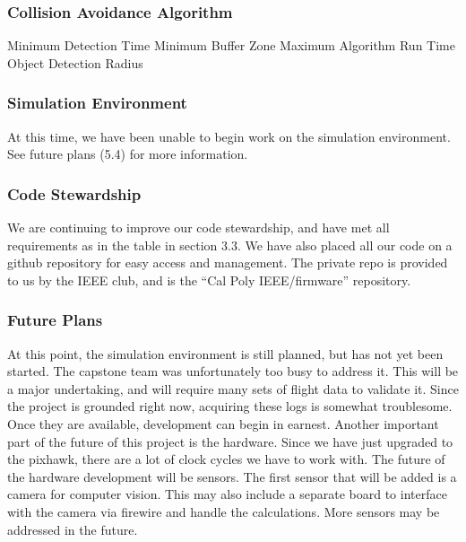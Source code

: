\documentclass[12pt]{article}
\begin{document}
\subsubsection{Collision Avoidance Algorithm}
Minimum Detection Time
Minimum Buffer Zone
Maximum Algorithm Run Time
Object Detection Radius

\subsubsection{Simulation Environment}
At this time, we have been unable to begin work on the simulation environment. See future plans (5.4) for more information.

\subsubsection{Code Stewardship}
We are continuing to improve our code stewardship, and have met all requirements as in the table in section 3.3. We have also placed all our code on a github repository for easy access and management. The private repo is provided to us by the IEEE club, and is the “Cal Poly IEEE/firmware” repository.

\subsubsection{Future Plans}
	At this point, the simulation environment is still planned, but has not yet been started. The capstone team was unfortunately too busy to address it. This will be a major undertaking, and will require many sets of flight data to validate it. Since the project is grounded right now, acquiring these logs is somewhat troublesome. Once they are available, development can begin in earnest.
	Another important part of the future of this project is the hardware. Since we have just upgraded to the pixhawk, there are a lot of clock cycles we have to work with. The future of the hardware development will be sensors. The first sensor that will be added is a camera for computer vision. This may also include a separate board to interface with the camera via firewire and handle the calculations. More sensors may be addressed in the future. 
\end{document}

